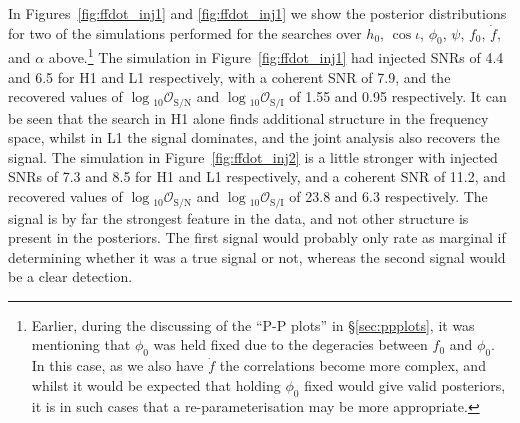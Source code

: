 In Figures~\ref{fig:ffdot_inj1} and \ref{fig:ffdot_inj1} we show the posterior distributions for two of the simulations performed for the searches over
$h_0$, $\cos{\iota}$, $\phi_0$, $\psi$, $f_0$, $\dot{f}$, and $\alpha$ above.\footnote{Earlier, during the discussing of the ``P-P plots'' in \S\ref{sec:ppplots},
it was mentioning that $\phi_0$ was held fixed due to the degeracies between $f_0$ and $\phi_0$. In this case, as we also have $\dot{f}$ the correlations
become more complex, and whilst it would be expected that holding $\phi_0$ fixed would give valid posteriors, it is in such cases that a re-parameterisation
may be more appropriate.} The simulation in Figure~\ref{fig:ffdot_inj1} had injected SNRs of 4.4 and 6.5 for H1
and L1 respectively, with a coherent SNR of 7.9, and the recovered values of $\log{}_{10}\mathcal{O}_{\text{S}/\text{N}}$ and
$\log{}_{10}\mathcal{O}_{\text{S}/\text{I}}$ of 1.55 and 0.95 respectively. It can be seen that the search in H1 alone finds additional structure
in the frequency space, whilst in L1 the signal dominates, and the joint analysis also recovers the signal. The simulation in Figure~\ref{fig:ffdot_inj2}
is a little stronger with injected SNRs of 7.3 and 8.5 for H1 and L1 respectively, and a coherent SNR of 11.2, and recovered values of 
$\log{}_{10}\mathcal{O}_{\text{S}/\text{N}}$ and $\log{}_{10}\mathcal{O}_{\text{S}/\text{I}}$ of 23.8 and 6.3 respectively. The signal is by far the strongest
feature in the data, and not other structure is present in the posteriors. The first signal would probably only rate as marginal if determining whether it was
a true signal or not, whereas the second signal would be a clear detection.
